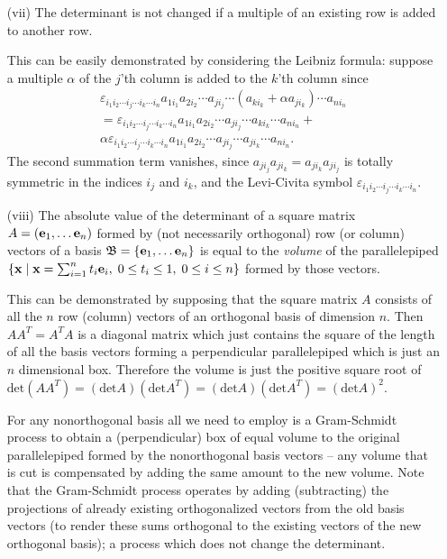 \begin{itemize}
\item[(vii)]
The determinant is not changed if a multiple of an existing row is added to another row.

{\color{OliveGreen}
\bproof
This can be easily demonstrated by considering the Leibniz formula: suppose a multiple $\alpha$
of the $j$'th column is added to the $k$'th column since
\begin{equation}
\begin{split}
\varepsilon_{i_1 i_2\cdots i_j \cdots i_k \cdots i_n} a_{1i_1}a_{2i_2} \cdots a_{j i_j} \cdots (a_{k i_k} + \alpha a_{j i_k}) \cdots a_{ni_n}\\
=
\varepsilon_{i_1 i_2\cdots i_j \cdots i_k \cdots i_n} a_{1i_1}a_{2i_2} \cdots a_{j i_j} \cdots  a_{k i_k} \cdots a_{ni_n} +\\
\alpha \varepsilon_{i_1 i_2\cdots i_j \cdots i_k \cdots i_n} a_{1i_1}a_{2i_2} \cdots a_{j i_j} \cdots   a_{j i_k} \cdots a_{ni_n}.
\end{split}
\end{equation}
The second summation term vanishes, since
$
a_{j i_j} a_{j i_k}
=
a_{j i_k} a_{j i_j}
$
is totally symmetric in the indices $i_j$ and $i_k$,
and the Levi-Civita symbol $\varepsilon_{i_1 i_2\cdots i_j \cdots i_k \cdots i_n}$.
\eproof
}

\item[(viii)]
The absolute value of the determinant of a square matrix $A= \left({\bf e}_1, \ldots {\bf e}_n \right)$ formed by (not necessarily orthogonal)
row (or column) vectors of a basis
$\frak B= \{ {\bf e}_1, \ldots {\bf e}_n\}$
is equal to the {\em volume} of the parallelepiped
$
\left\{ {\bf x} \mid {\bf x} =\sum_{i=1}^n t_i {\bf e}_i, \; 0 \le t_i \le 1, \; 0\le i \le n \right\}
$
formed by those vectors.

{\color{OliveGreen}
\bproof
This can be demonstrated 
by supposing that
the square matrix $A$ consists of all the $n$ row (column) vectors of an orthogonal basis of dimension $n$.
Then
$AA^T=A^TA$ is a  diagonal matrix  which just contains the square of the
length of all the basis vectors forming a perpendicular parallelepiped which
is just an $n$ dimensional box.
Therefore the volume is just the positive square root of
$\textrm{det} ( AA^T ) =
(\textrm{det} A) (\textrm{det} A^T ) = (\textrm{det} A) (\textrm{det} A^T )=(\textrm{det} A)^2$.

For any nonorthogonal basis all we need to employ is a Gram-Schmidt process
to obtain a (perpendicular) box of equal volume to the original parallelepiped
formed by the nonorthogonal basis vectors --
any volume that is cut is compensated by adding the same amount to the new volume.
Note that the Gram-Schmidt process operates by adding (subtracting) the projections
of already existing orthogonalized vectors
from the old basis vectors (to render these sums orthogonal to the existing vectors of the new orthogonal basis);
a process which does not change the determinant.
\eproof
}


\end{itemize}
